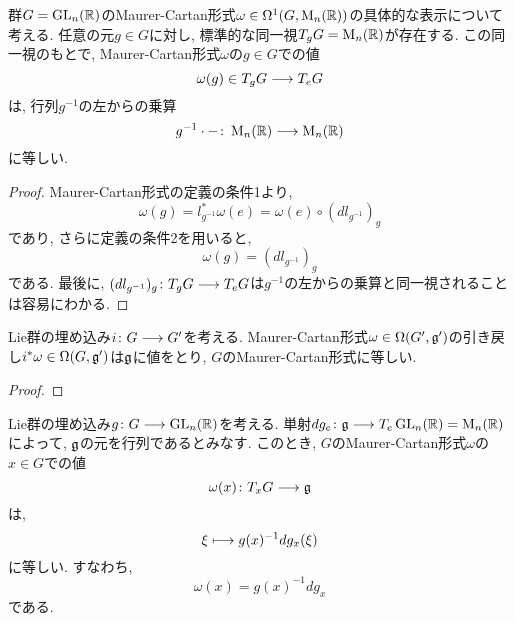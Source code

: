 \begin{lem}
群$G = \operatorname{GL}_n(\mathbb{R})$のMaurer-Cartan形式$\omega \in \Omega^1(G, \operatorname{M}_n(\mathbb{R}))$の具体的な表示について考える.
任意の元$g \in G$に対し, 標準的な同一視$T_gG = \operatorname{M}_n(\mathbb{R})$が存在する.
この同一視のもとで, Maurer-Cartan形式$\omega$の$g \in G$での値
\begin{equation}
\omega(g) \in T_gG \longrightarrow T_eG
\end{equation}
は, 行列$g^{-1}$の左からの乗算
\begin{equation}
g^{-1} \cdot - \colon \operatorname{M}_n(\mathbb{R}) \longrightarrow \operatorname{M}_n(\mathbb{R})
\end{equation}
に等しい.
\end{lem}

\begin{proof}
Maurer-Cartan形式の定義の条件1より,
\begin{equation}
\omega(g) = l_{g^{-1}}^* \omega(e) = \omega(e) \circ (dl_{g^{-1}})_g
\end{equation}
であり, さらに定義の条件2を用いると,
\begin{equation}
\omega(g) = (dl_{g^{-1}})_g
\end{equation}
である.
最後に, $(dl_{g^{-1}})_g \colon T_gG \longrightarrow T_eG$は$g^{-1}$の左からの乗算と同一視されることは容易にわかる.
\end{proof}

\begin{lem}
Lie群の埋め込み$i \colon G \longrightarrow G'$を考える.
Maurer-Cartan形式$\omega \in \Omega(G', \mathfrak{g}')$の引き戻し$i^*\omega \in \Omega(G, \mathfrak{g}')$は$\mathfrak{g}$に値をとり, $G$のMaurer-Cartan形式に等しい.
\end{lem}

\begin{proof}

\end{proof}

\begin{thm}
Lie群の埋め込み$g \colon G \longrightarrow \operatorname{GL}_n(\mathbb{R})$を考える.
単射$dg_e \colon \mathfrak{g} \longrightarrow T_{e}\operatorname{GL}_n(\mathbb{R}) = \operatorname{M}_n(\mathbb{R})$によって, $\mathfrak{g}$の元を行列であるとみなす.
このとき, $G$のMaurer-Cartan形式$\omega$の$x \in G$での値
\begin{equation}
\omega(x) \colon T_xG \longrightarrow \mathfrak{g}
\end{equation}
は,
\begin{equation}
\xi \longmapsto g(x)^{-1} dg_x(\xi)
\end{equation}
に等しい.
すなわち,
\begin{equation}
\omega(x) = g(x)^{-1} dg_x
\end{equation}
である.
\end{thm}

